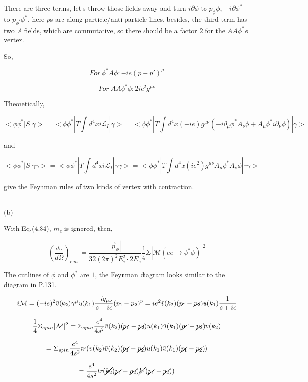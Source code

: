 \documentclass[11pt]{article} %
\begin{document}
There are three terms, let's throw those fields away and turn $i \partial \phi$ to $p_{\phi} \phi$, $-i \partial \phi^*$ to $p_{\phi^*} \phi^*$, here $p$s are along particle/anti-particle lines, besides, the third term has two $A$ fields, which are commutative, so there should be a factor $2$ for the $AA\phi^*\phi$ vertex.

So, 

\[For\ \phi^* A \phi: -i e (p + p')^{\mu}\]

\[For\ AA\phi^* \phi: 2 i e^2 g^{\mu \nu}\]


Theoretically, 

\[ <\phi \phi^* | S | \gamma> = <\phi \phi^* | T \int d^4 x i \mathcal{L}_I | \gamma> = <\phi \phi^* | T \int d^4 x (-i e) g^{\mu \nu} (-i \partial_{\mu} \phi^* A_{\nu} \phi + A_{\mu} \phi^* i \partial_{\nu} \phi) | \gamma> \]

and 

\[ <\phi \phi^* | S | \gamma \gamma> = <\phi \phi^* | T \int d^4 x i \mathcal{L}_I | \gamma \gamma> = <\phi \phi^* | T \int d^4 x (i e^2) g^{\mu \nu} A_{\mu} \phi^* A_{\nu} \phi | \gamma \gamma> \]

give the Feynman rules of two kinds of vertex with contraction.


~\\
\noindent (b)

With Eq.(4.84), $m_e$ is ignored, then,

\[(\frac{d \sigma}{d \Omega})_{c.m.} = \frac{|\vec{p}_{\phi}|}{32 (2\pi)^2 E_{e}^2 \cdot 2 E_e } \frac{1}{4} \Sigma |\mathcal{M}(ee \to \phi^*\phi)|^2\]

The outlines of $\phi$ and $\phi^*$ are $1$, the Feynman diagram looks similar to the diagram in P.131.

\[ i \mathcal{M} = (-i e)^2 \bar{v}(k_2) \gamma^{\mu} u(k_1) \frac{-i g_{\mu \nu}}{s + i \epsilon} (p_1 - p_2)^{\nu} = i e^2 \bar{v}(k_2) (\cancel{p_1} - \cancel{p_2}) u(k_1) \frac{1}{s + i \epsilon}\]

\[\frac{1}{4} \Sigma_{spin} |\mathcal{M}|^2 = \Sigma_{spin} \frac{e^4}{4 s^2} \bar{v}(k_2) (\cancel{p_1} - \cancel{p_2}) u(k_1) \bar{u}(k_1) (\cancel{p_1} - \cancel{p_2}) v(k_2) \]

\[ = \Sigma_{spin} \frac{e^4}{4 s^2} tr( v(k_2) \bar{v}(k_2) (\cancel{p_1} - \cancel{p_2}) u(k_1) \bar{u}(k_1) (\cancel{p_1} - \cancel{p_2}) ) \]

\[ = \frac{e^4}{4 s^2} tr( \cancel{k_2} (\cancel{p_1} - \cancel{p_2}) \cancel{k_1} (\cancel{p_1} - \cancel{p_2}) ) \]
\end{document}
